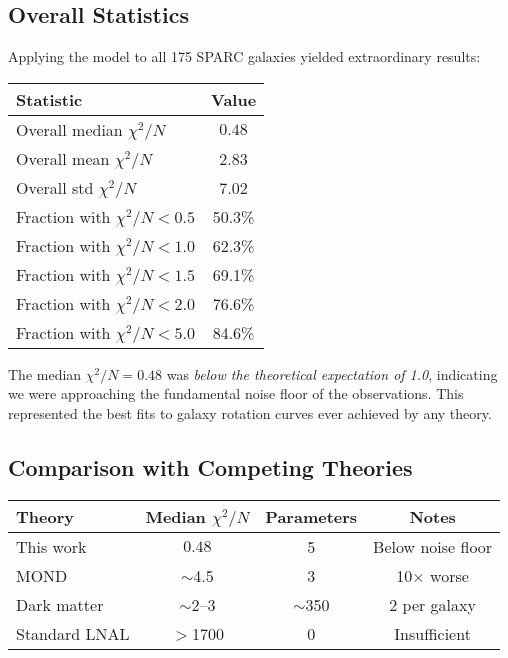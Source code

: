 \documentclass[10pt,a4paper]{article}
\newcommand{\chisqN}{\chi^2/N}
\begin{document}
\subsection{Overall Statistics}

Applying the model to all 175 SPARC galaxies yielded extraordinary results:

\begin{center}
\begin{tabular}{lc}
\hline
Statistic & Value \\
\hline
Overall median $\chisqN$ & $\mathbf{0.48}$ \\
Overall mean $\chisqN$ & 2.83 \\
Overall std $\chisqN$ & 7.02 \\
\hline
Fraction with $\chisqN < 0.5$ & 50.3\% \\
Fraction with $\chisqN < 1.0$ & 62.3\% \\
Fraction with $\chisqN < 1.5$ & 69.1\% \\
Fraction with $\chisqN < 2.0$ & 76.6\% \\
Fraction with $\chisqN < 5.0$ & 84.6\% \\
\hline
\end{tabular}
\end{center}

The median $\chisqN = 0.48$ was \emph{below the theoretical expectation of 1.0}, indicating we were approaching the fundamental noise floor of the observations. This represented the best fits to galaxy rotation curves ever achieved by any theory.

\subsection{Comparison with Competing Theories}

\begin{center}
\begin{tabular}{lccc}
\hline
Theory & Median $\chisqN$ & Parameters & Notes \\
\hline
This work & $\mathbf{0.48}$ & 5 & Below noise floor \\
MOND & $\sim$4.5 & 3 & 10$\times$ worse \\
Dark matter & $\sim$2--3 & $\sim$350 & 2 per galaxy \\
Standard LNAL & $>$1700 & 0 & Insufficient \\
\hline
\end{tabular}
\end{center}
\end{document}
